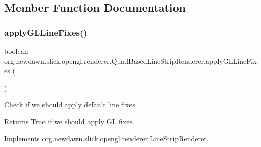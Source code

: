 \subsection{Member Function Documentation}
\mbox{\label{classorg_1_1newdawn_1_1slick_1_1opengl_1_1renderer_1_1_quad_based_line_strip_renderer_a535a64f5cf41e3373c44d6afbc3036f1}} 
\subsubsection{\texorpdfstring{apply\+G\+L\+Line\+Fixes()}{applyGLLineFixes()}}
{\footnotesize\ttfamily boolean org.\+newdawn.\+slick.\+opengl.\+renderer.\+Quad\+Based\+Line\+Strip\+Renderer.\+apply\+G\+L\+Line\+Fixes (\begin{DoxyParamCaption}{ }\end{DoxyParamCaption})\hspace{0.3cm}{\ttfamily [inline]}}

Check if we should apply default line fixes

\begin{DoxyReturn}{Returns}
True if we should apply GL fixes 
\end{DoxyReturn}


Implements \mbox{\hyperlink{interfaceorg_1_1newdawn_1_1slick_1_1opengl_1_1renderer_1_1_line_strip_renderer_a6cacd7974c575c5e49034a89a51492c2}{org.\+newdawn.\+slick.\+opengl.\+renderer.\+Line\+Strip\+Renderer}}.


